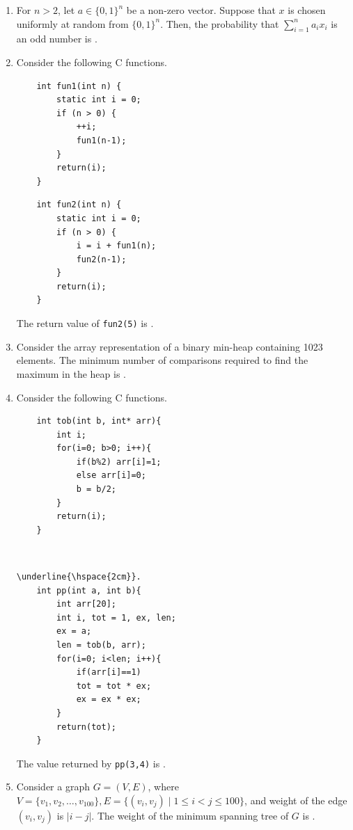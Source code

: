 \documentclass[journal,12pt,onecolumn]{IEEEtran}
\theoremstyle{remark}
\begin{document}
\begin{enumerate}
\hfill{}

\item For $n > 2$, let $a \in \{0,1\}^n$ be a non-zero vector. Suppose that $x$ is chosen uniformly at random from $\{0,1\}^n$. Then, the probability that $\sum_{i=1}^n a_i x_i$ is an odd number is \underline{\hspace{2cm}}.  

\hfill{}

\item Consider the following C functions.
\begin{verbatim}
	int fun1(int n) {
		static int i = 0;
		if (n > 0) {
			++i;
			fun1(n-1);
		}
		return(i);
	}
\end{verbatim}
\begin{verbatim}
	int fun2(int n) {
		static int i = 0;
		if (n > 0) {
			i = i + fun1(n);
			fun2(n-1);
		}
		return(i);
	}
\end{verbatim}
The return value of \texttt{fun2(5)} is \underline{\hspace{2cm}}.\\
\item Consider the array representation of a binary min-heap containing 1023 elements. 
The minimum number of comparisons required to find the maximum in the heap is \underline{\hspace{2cm}}.  
\hfill{}
\\
\item Consider the following C functions.
\begin{verbatim}
	int tob(int b, int* arr){
		int i;
		for(i=0; b>0; i++){
			if(b%2) arr[i]=1;
			else arr[i]=0;
			b = b/2;
		}
		return(i);
	}
\end{verbatim}
\underline{\hspace{6cm}}\\
\begin{verbatim}
\underline{\hspace{2cm}}.
	int pp(int a, int b){
		int arr[20];
		int i, tot = 1, ex, len;
		ex = a;
		len = tob(b, arr);
		for(i=0; i<len; i++){
			if(arr[i]==1)
			tot = tot * ex;
			ex = ex * ex;
		}
		return(tot);
	}
\end{verbatim}
The value returned by \texttt{pp(3,4)} is \underline{\hspace{2cm}}.  
\hfill{}

\item Consider a graph $G = (V,E)$, where $V = \{v_1,v_2,\dots,v_{100}\}, 
E = \{(v_i,v_j) \mid 1 \leq i < j \leq 100\}$, and weight of the edge $(v_i,v_j)$ is $|i-j|$.  
The weight of the minimum spanning tree of $G$ is \underline{\hspace{2cm}}.  
\hfill{}


\end{enumerate}
\end{document}
